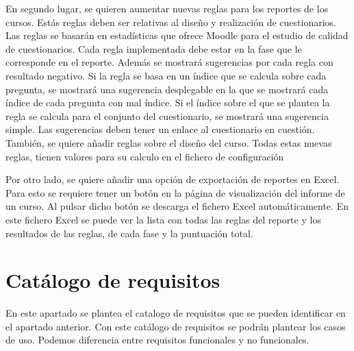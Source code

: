 En segundo lugar, se quieren aumentar nuevas reglas para los reportes de los cursos. Estás reglas deben  ser relativas al diseño y realización de cuestionarios. Las reglas se basarán en estadísticas que ofrece Moodle para el estudio de calidad de cuestionarios. Cada regla implementada debe estar en la fase que le corresponde en el reporte. Además se mostrará sugerencias por cada regla con resultado negativo. Si la regla se basa en un índice que se calcula sobre cada pregunta, se mostrará una sugerencia desplegable en la que se mostrará cada índice de cada pregunta con mal índice. Si el índice sobre el que se plantea la regla se calcula para el conjunto del cuestionario, se mostrará una sugerencia simple. Las sugerencias deben tener un enlace al cuestionario en cuestión. También, se quiere añadir reglas sobre el diseño del curso. Todas estas nuevas reglas, tienen valores para su calculo en el fichero de configuración

Por otro lado, se quiere añadir una opción de exportación de reportes en Excel. Para esto se requiere tener un botón en la página de visualización del informe de un curso. Al pulsar dicho botón se descarga el fichero Excel automáticamente. En este fichero Excel se puede ver la lista con todas las reglas del reporte y los resultados de las reglas, de cada fase y la puntuación total.

\section{Catálogo de requisitos}
En este apartado se plantea el catalogo de requisitos que se pueden identificar en el apartado anterior. Con este catálogo de requisitos se podrán plantear los casos de uso. Podemos diferencia entre requisitos funcionales y no funcionales.

